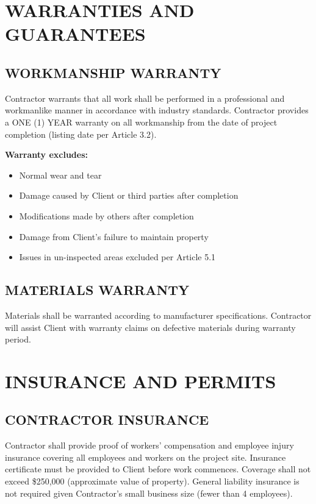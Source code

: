 \documentclass[10pt,letterpaper]{article}
\begin{document}
\section{WARRANTIES AND GUARANTEES}

\subsection{WORKMANSHIP WARRANTY}
Contractor warrants that all work shall be performed in a professional and workmanlike manner in accordance with industry standards. Contractor provides a ONE (1) YEAR warranty on all workmanship from the date of project completion (listing date per Article 3.2).

\noindent\textbf{Warranty excludes:}
\begin{itemize}[leftmargin=*]
\item Normal wear and tear
\item Damage caused by Client or third parties after completion
\item Modifications made by others after completion
\item Damage from Client's failure to maintain property
\item Issues in un-inspected areas excluded per Article 5.1
\end{itemize}

\subsection{MATERIALS WARRANTY}
Materials shall be warranted according to manufacturer specifications. Contractor will assist Client with warranty claims on defective materials during warranty period.

\section{INSURANCE AND PERMITS}

\subsection{CONTRACTOR INSURANCE}
Contractor shall provide proof of workers' compensation and employee injury insurance covering all employees and workers on the project site. Insurance certificate must be provided to Client before work commences. Coverage shall not exceed \$250,000 (approximate value of property). General liability insurance is not required given Contractor's small business size (fewer than 4 employees).
\end{document}
